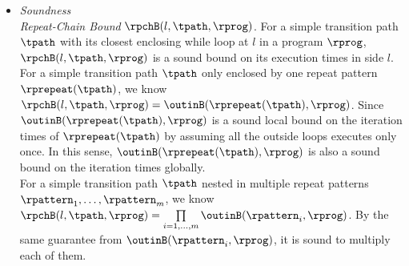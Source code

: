   \begin{itemize}
  \item 
  \emph{Soundness}
  \\
  \emph{Repeat-Chain Bound}  $\rpchB(l, \tpath, \rprog)$.
  For a simple transition path $\tpath$ with its closest enclosing while loop at $l$ in a program $\rprog$, $\rpchB(l, \tpath, \rprog)$
  is a sound bound on its execution times in side $l$.
  \\
  For a simple transition path $\tpath$ only enclosed by one repeat pattern $\rprepeat(\tpath)$, 
  we know $\rpchB(l, \tpath, \rprog) = \outinB(\rprepeat(\tpath), \rprog)$.
  Since $\outinB(\rprepeat(\tpath), \rprog)$ is a sound local bound on the iteration times
  of $\rprepeat(\tpath)$ by assuming all the outside loops executes only once.
  In this sense, $\outinB(\rprepeat(\tpath), \rprog)$ is also a sound bound on the iteration times globally.
  \\
  For a simple transition path $\tpath$ nested in multiple repeat patterns $\rpattern_1, \ldots, \rpattern_m$,
  we know $\rpchB(l, \tpath, \rprog) = \prod\limits_{i = 1, \ldots, m}\outinB(\rpattern_i, \rprog)$.
  By the same guarantee from $\outinB(\rpattern_i, \rprog)$, it is sound to multiply each of them.
  

\end{itemize}
